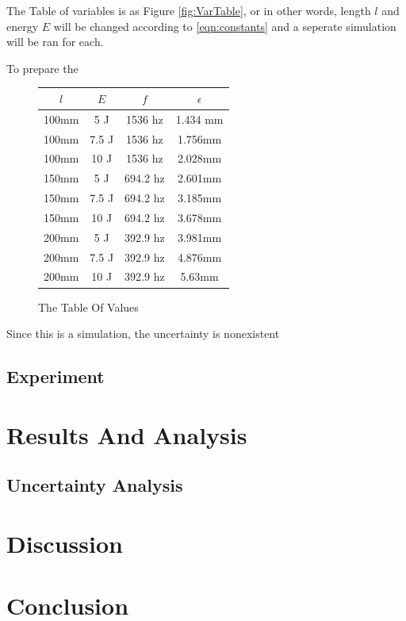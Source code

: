 \documentclass[a4paper,12pt]{article}
\begin{document}
    The Table of variables is as Figure \ref{fig:VarTable}, or in other words, length $l$ and energy $E$ will be changed according to \eqref{eqn:constants} and a seperate simulation will be ran for each.

    To prepare the
    \begin{figure}[h]%
    \begin{center}
    \begin{tabular}{|c|c||c|c|}
    \hline
    $l$ & $E$ & $f$& $\epsilon$ \\
    \hline\hline
    100mm & 5 J & 1536 hz & 1.434 mm \\
    \hline
    100mm & 7.5 J & 1536 hz & 1.756mm \\
    \hline
    100mm & 10 J & 1536 hz & 2.028mm \\
    \hline
    150mm & 5 J & 694.2 hz & 2.601mm \\
    \hline
    150mm & 7.5 J & 694.2 hz & 3.185mm \\
    \hline
    150mm & 10 J & 694.2 hz & 3.678mm \\
    \hline
    200mm & 5 J & 392.9 hz & 3.981mm \\
    \hline
    200mm & 7.5 J & 392.9 hz & 4.876mm \\
    \hline
    200mm & 10 J & 392.9 hz & 5.63mm \\
    \hline


    \end{tabular}
    \end{center}
    \caption{The Table Of Values}\label{fig:FEAtable}
    \end{figure}

    Since this is a simulation, the uncertainty is nonexistent


    \subsection{Experiment}


\section{Results And Analysis}%
    \subsection{Uncertainty Analysis}

\section{Discussion}%

\section{Conclusion}%

\pagebreak
{}
\printbibliography
\end{document}
